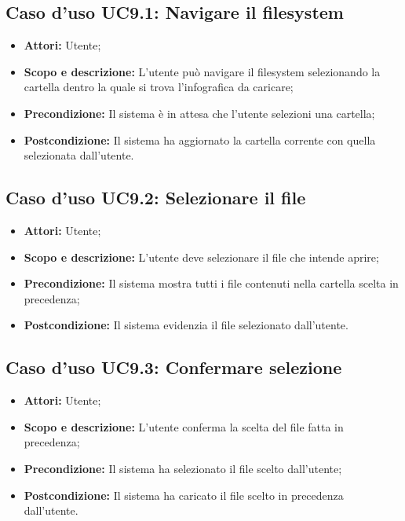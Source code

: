 \subsection{Caso d'uso UC9.1: Navigare il filesystem}
\begin{itemize}
	\item \textbf{Attori:} Utente;
	\item \textbf{Scopo e descrizione:} L'utente può navigare il \gls{filesystem} selezionando la cartella dentro la quale si trova l'\gls{infografica} da caricare;
	\item \textbf{Precondizione:} Il sistema è in attesa che l'utente selezioni una cartella;
	\item \textbf{Postcondizione:} Il sistema ha aggiornato la cartella corrente con quella selezionata dall'utente.
\end{itemize}

\subsection{Caso d'uso UC9.2: Selezionare il file}
\begin{itemize}
	\item \textbf{Attori:} Utente;
	\item \textbf{Scopo e descrizione:} L'utente deve selezionare il file che intende aprire;
	\item \textbf{Precondizione:} Il sistema mostra tutti i file contenuti nella cartella scelta in precedenza;
	\item \textbf{Postcondizione:} Il sistema evidenzia il file selezionato dall'utente.
\end{itemize}

\subsection{Caso d'uso UC9.3: Confermare selezione}
\begin{itemize}
	\item \textbf{Attori:} Utente;
	\item \textbf{Scopo e descrizione:} L'utente conferma la scelta del file fatta in precedenza;
	\item \textbf{Precondizione:} Il sistema ha selezionato il file scelto dall'utente;
	\item \textbf{Postcondizione:} Il sistema ha caricato il file scelto in precedenza dall'utente.
\end{itemize}